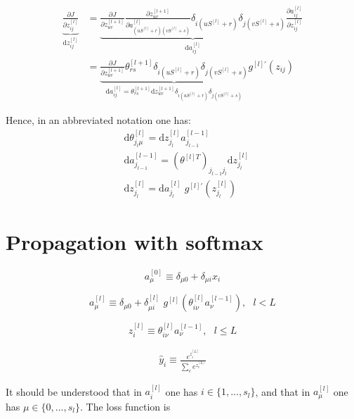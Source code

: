 \documentclass[a4paper,11pt]{article}
\newcommand{\dd}{\text{d}}
\newcommand{\na}[2]{a_{#1}^{[#2]}}
\newcommand{\nz}[2]{z_{#1}^{[#2]}}
\newcommand{\nt}[3]{\theta_{#1 #2}^{[#3]}}
\newcommand{\ff}[2]{#1 \left(#2 \right)}
\begin{document}
\begin{align}
\underbrace{
\frac{\partial J  }{\partial \nz{ij }{l}   }
}_{\dd  \nz{ij }{l} }
	&=
	\underbrace{ 
	\frac{\partial J  }{\partial \nz{uv}{l+1}   } 
	\frac{\partial \nz{uv}{l+1}   }{ \partial \na{ (uS^{[l]} +r )(vS^{[l]}+s)}{l}  }
	\delta_{i (uS^{[l]} +r )} \delta_{j (vS^{[l]} +s )}
	}_{\dd a_{ij}^{[l]} }
	\frac{\partial \na{ij}{l}    }{ \partial \nz{ij}{l}  }
	\\
	&=
	\underbrace{
	\frac{\partial J  }{\partial \nz{ uv  }{l+1}   } 
	 \nt{r}{s}{l+1}
	 \delta_{i (uS^{[l]} +r )} \delta_{j (vS^{[l]} +s )}
	 }_{\dd a_{ij}^{[l]}
	 =\theta^{[l+1]}_{ rs} \dd z_{uv}^{[l+1]} 
	  \delta_{i (uS^{[l]} +r )} \delta_{j (vS^{[l]} +s )}
	 } 
	 g^{[l]'}\left( z_{ij}   \right) 
\end{align}

Hence, in an abbreviated notation one has:
\begin{eqnarray}
	&\dd  \nt{j_l}{\mu}{l} = \dd  \nz{j_{l}}{l}  \na{j_{l-1}}{l-1}\\
	&\dd a_{j_{l-1}}^{[l-1]}=(\theta^{[l]T})_{j_{l-1} j_{l}} \dd z_{j_{l}}^{[l]}\\
	&\dd  \nz{j_{l}}{l}= \dd a_{j_l}^{[l]} \,\, g^{[l]'}\left( z_{j_{l}}^{[l]}   \right)
\end{eqnarray}

\section{Propagation with softmax }


\begin{equation}
    \na{\mu}{0} \equiv \delta_{\mu0}+\delta_{\mu i} x_i %
\end{equation}

\begin{equation}
    \na{\mu}{l} \equiv \delta_{\mu0} +\delta_{\mu i }^{[l]}\,\,
    \ff{g^{[l]}}{  \nt{i}{\nu}{l}\na{\nu }{l-1}  } , \,\,\,\, l<L %
\end{equation}

\begin{equation}
    \nz{i}{l}\equiv \nt{i}{\nu}{l}\na{\nu }{l-1} ,\,\,\,\, l\le L %
\end{equation}

\begin{align}
 \hat{y}_i \equiv   \frac{e^{\nz{i}{L}} } {\sum_c e^{\nz{c}{L} }}
\end{align}

It should be understood that in $\na{i}{l}$ 
one has  $i \in \{1,..., s_l\} $, 
and that in $\na{\mu}{l}$ one has $ \mu \in \{0,..., s_l\}$. The loss function is
\end{document}
